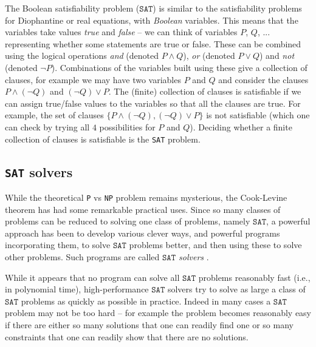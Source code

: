 \documentclass{amsart}
\theoremstyle{plain}
\theoremstyle{definition}
\theoremstyle{remark}
\begin{document}
The Boolean satisfiability problem (\(\texttt{SAT}\)) is similar to the satisfiability
problems for Diophantine or real equations, with \emph{Boolean} variables.
This means that the variables take values \emph{true} and \emph{false} -- we
can think of variables $P$, $Q$, ... representing whether some statements are
true or false. These can be combined using the logical operations \emph{and}
(denoted $P\wedge Q$), \emph{or} (denoted $P\vee Q$) and \emph{not} (denoted $\neg P$).
Combinations of the variables built using these give a collection of clauses, for example we
may have two variables $P$ and $Q$ and consider the clauses $P\wedge(\neg Q)$ and $(\neg Q)\vee P$.
The (finite) collection of clauses is satisfiable if we can assign true/false values to the variables
so that all the clauses are true. For example, the set of clauses $\{P\wedge(\neg Q), (\neg Q)\vee P\}$
is not satisfiable (which one can check by trying all $4$ possibilities for $P$ and $Q$).
Deciding whether a finite collection of clauses is satisfiable is
the \texttt{SAT} problem.


\subsection{\texttt{SAT} solvers}\label{sat-solvers}

While the theoretical \texttt{P} vs \texttt{NP} problem remains mysterious, the
Cook-Levine theorem has had some remarkable practical uses. Since so
many classes of problems can be reduced to solving one class of
problems, namely \(\texttt{SAT}\), a powerful approach has been to develop
various clever ways, and powerful programs incorporating them, to solve
\(\texttt{SAT}\) problems better, and then using these to solve other problems.
Such programs are called \emph{\(\texttt{SAT}\) solvers} .


While it appears that no program can solve all \(\texttt{SAT}\) problems
reasonably fast (i.e., in polynomial time), high-performance \(\texttt{SAT}\)
solvers try to solve as large a class of \(\texttt{SAT}\) problems as quickly as
possible in practice. Indeed in many cases a \(\texttt{SAT}\) problem may not be too
hard -- for example the problem becomes reasonably easy if there are either so
many solutions that one can readily find one or so many constraints that
one can readily show that there are no solutions.
\end{document}
